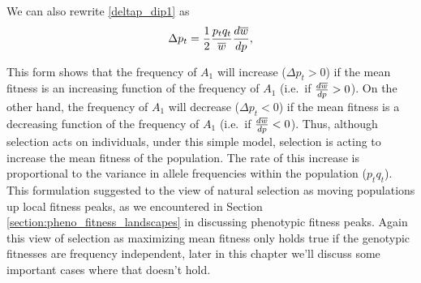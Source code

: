 We can also rewrite \eqref{deltap_dip1} as
\begin{equation}
\Delta p_t =\frac{1}{2} \frac{p_tq_t}{\overline{w}} \frac{d \overline{w}}{dp}, 
\label{deltap_dip3}
\end{equation}

This form shows that the frequency of $A_1$ will increase ($\Delta p_t > 0$) if the mean fitness is an increasing function of the frequency of $A_1$ (i.e.\ if $\frac{d \overline{w}}{dp}>0$). On the other hand, the frequency of $A_1$ will decrease ($\Delta p_t < 0$) if the mean fitness is a decreasing function of the frequency of $A_1$ (i.e.\ if $\frac{d \overline{w}}{dp}<0$).
Thus, although selection acts on
individuals, under this simple model, selection is acting to increase
the mean fitness of the population. The rate of this increase is proportional to
the variance in allele frequencies within the population
($p_tq_t$). This formulation suggested to \citet{wright1932} the view of natural
selection as moving populations up local fitness peaks, as we
encountered in Section \ref{section:pheno_fitness_landscapes} in
discussing phenotypic fitness peaks. Again this view of selection as
maximizing mean fitness only holds true
if the genotypic fitnesses are frequency independent, later in this
chapter we'll discuss some important cases where that doesn't hold. \\


